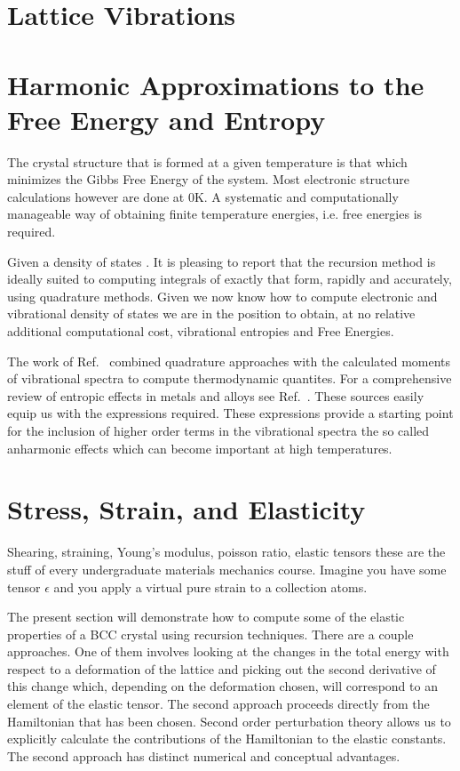 \section{Lattice Vibrations}

\section{Harmonic Approximations to the Free Energy and Entropy}
The crystal structure that is formed at a given temperature is that which
minimizes the Gibbs Free Energy of the system. Most electronic structure calculations
however are done at 0K. A systematic and computationally manageable way of obtaining
finite temperature energies, i.e. free energies is required.

Given a density of states . It is pleasing to report that the recursion method
is ideally suited to computing integrals of exactly that form, rapidly and accurately,
using quadrature methods. Given we now know how to compute electronic and 
vibrational density of states we are in the position to obtain, at no relative additional 
computational cost, vibrational entropies and Free Energies.

The work of Ref.~\cite{wheeler68} combined quadrature approaches
with the calculated moments of vibrational spectra to compute
thermodynamic quantites. For a comprehensive review
of entropic effects in metals and alloys see Ref.~\cite{fultz10}. 
These sources easily equip us with the expressions required. These expressions provide a starting
point for the inclusion of higher order terms in the vibrational spectra
the so called anharmonic effects which can become important at high temperatures.

\section{Stress, Strain, and Elasticity}
Shearing, straining, Young's modulus, poisson ratio, elastic tensors these are the
stuff of every undergraduate materials mechanics course.
Imagine you have some tensor $\epsilon$ and you apply a virtual pure strain to a collection atoms.

The present section will demonstrate how to compute some of the elastic properties
of a BCC crystal using recursion techniques. There are a couple approaches.
One of them involves looking at the changes in the total energy with
respect to a deformation of the lattice and picking out the 
second derivative of this change which, depending on the deformation chosen,
will correspond to an element of the elastic tensor. The second approach
proceeds directly from the Hamiltonian that has been chosen. Second order
perturbation theory allows us to explicitly calculate the contributions of
the Hamiltonian to the elastic constants. The second approach has distinct
numerical and conceptual advantages.

